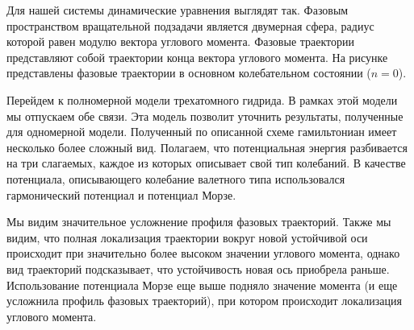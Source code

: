 \documentclass[12pt]{article}
\begin{document}
Для нашей системы динамические уравнения выглядят так. Фазовым пространством вращательной подзадачи является двумерная сфера, радиус которой равен модулю вектора углового момента. Фазовые траектории представляют собой траектории конца вектора углового момента. На рисунке представлены фазовые траектории в основном колебательном состоянии ($n = 0$). \par 
Перейдем к полномерной модели трехатомного гидрида. В рамках этой модели мы отпускаем обе связи. Эта модель позволит уточнить результаты, полученные для одномерной модели.
Полученный по описанной схеме гамильтониан имеет несколько более сложный вид. Полагаем, что потенциальная энергия разбивается на три слагаемых, каждое из которых описывает свой тип колебаний. В качестве потенциала, описывающего колебание валетного типа использовался гармонический потенциал и потенциал Морзе. \par
Мы видим значительное усложнение профиля фазовых траекторий. Также мы видим, что полная локализация траектории вокруг новой устойчивой оси происходит при значительно более высоком значении углового момента, однако вид траекторий подсказывает, что устойчивость новая ось приобрела раньше. Использование потенциала Морзе еще выше подняло значение момента (и еще усложнила профиль фазовых траекторий), при котором происходит локализация углового момента.
\end{document}
